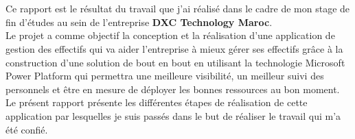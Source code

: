 \titlespacing*{\chapter}{0pt}{1.80in}{0in}
\chapter*{}
\titlespacing*{\chapter}{0pt}{0.45in}{0.3in}%
\vspace{1in}

Ce rapport est le résultat du travail que j'ai réalisé dans le cadre de mon stage de fin d'études au sein de l'entreprise \textbf{DXC Technology Maroc}.\\

Le projet a comme objectif la conception et la réalisation d'une application de gestion des effectifs qui va aider l'entreprise à mieux gérer ses effectifs grâce à la construction d'une solution de bout en bout en utilisant la technologie Microsoft Power Platform qui permettra une meilleure visibilité, un meilleur suivi des personnels et être en mesure de déployer les bonnes ressources au bon moment.\\ 

Le présent rapport présente les différentes étapes de réalisation de cette application par lesquelles je suis passés dans le but de réaliser le travail qui m'a été confié. 
